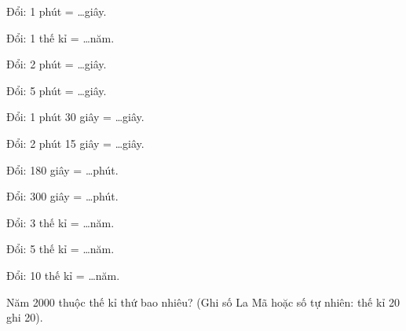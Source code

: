 \begin{ex}
Đổi: 1 phút = \dots giây.
\end{ex}

\begin{ex}
Đổi: 1 thế kỉ = \dots năm.
\end{ex}

\begin{ex}
Đổi: 2 phút = \dots giây.
\end{ex}

\begin{ex}
Đổi: 5 phút = \dots giây.
\end{ex}

\begin{ex}
Đổi: 1 phút 30 giây = \dots giây.
\end{ex}

\begin{ex}
Đổi: 2 phút 15 giây = \dots giây.
\end{ex}

\begin{ex}
Đổi: 180 giây = \dots phút.
\end{ex}

\begin{ex}
Đổi: 300 giây = \dots phút.
\end{ex}

\begin{ex}
Đổi: 3 thế kỉ = \dots năm.
\end{ex}

\begin{ex}
Đổi: 5 thế kỉ = \dots năm.
\end{ex}

\begin{ex}
Đổi: 10 thế kỉ = \dots năm.
\end{ex}

\begin{ex}
Năm 2000 thuộc thế kỉ thứ bao nhiêu? (Ghi số La Mã hoặc số tự nhiên: thế kỉ 20 ghi 20).
\end{ex}

